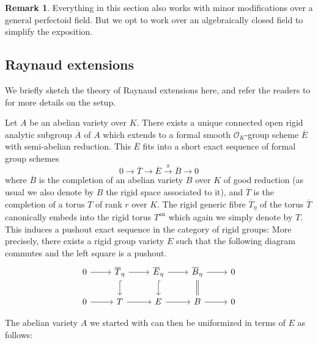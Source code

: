 \documentclass[10pt,oneside]{amsart}
\theoremstyle{definition}
\newtheorem{remark}[theorem]{Remark}
\begin{document}
	
	\begin{remark}\label{Remark on dealing with general perfectoid fields by Galois descent}
		Everything in this section also works with minor modifications over a general perfectoid field. But we opt to work over an algebraically closed field to simplify the exposition.
	\end{remark}
	
	
	\subsection{Raynaud extensions}
	
        We briefly sketch the theory of Raynaud extensions here, and refer the readers to  \cite{rigid geometry of curves} for more details on the setup.

	Let $A$ be an abelian variety over $K$. There exists a unique connected open rigid analytic subgroup $\overline A$ of $A$ which extends to a formal smooth $\mathcal O_K$-group scheme $\overline E$ with semi-abelian reduction. This $\overline E$ fits into a short exact sequence of formal group schemes
	\begin{equation}\label{formal Raynaud extension}
	0\rightarrow \overline T \rightarrow \overline E \xrightarrow{\pi} \overline{B}\rightarrow 0
	\end{equation}
	where $\overline{B}$ is the completion of an abelian variety $B$ over $K$ of good reduction (as usual we also denote by $B$ the rigid space associated to it), and $\overline{T}$ is the completion of a torus $T$ of rank $r$ over $K$.
	The rigid generic fibre $\overline{T}_\eta$ of the torus $\overline{T}$ canonically embeds into the rigid torus $T^{\operatorname{an}}$ which again we simply denote by $T$. This induces a pushout exact sequence in the category of rigid groups: More precisely, there exists a rigid group variety $E$ such that the following diagram commutes and the left square is a pushout.
		\begin{equation}\label{Raynaud diagram}
		\begin{tikzcd}
			0 \arrow[r] & \overline{T}_\eta \arrow[d, hook] \arrow[r] & \overline{E}_\eta \arrow[d, hook] \arrow[r] & \overline{B}_\eta \arrow[d,equal] \arrow[r] & 0 \\
			0 \arrow[r] & T \arrow[r] & E \arrow[r] & B \arrow[r] & 0
		\end{tikzcd}
		\end{equation}
	
	The abelian variety $A$ we started with can then be uniformized in terms of $E$ as follows:
	
\end{document}
